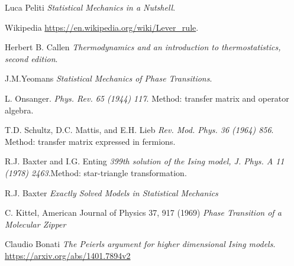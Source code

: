 
\cleardoublepage
{}
\begin{thebibliography}{99}


Luca Peliti
\textit{Statistical Mechanics in a Nutshell}.

Wikipedia 
\url{https://en.wikipedia.org/wiki/Lever_rule}.

Herbert B. Callen
\textit{Thermodynamics and an introduction to thermostatistics, second edition}.

J.M.Yeomans
\textit{Statistical Mechanics of Phase Transitions}.

L. Onsanger.
\textit{Phys. Rev. 65 (1944) 117}. Method: transfer matrix and operator algebra.

T.D. Schultz, D.C. Mattis, and E.H. Lieb
\textit{Rev. Mod. Phys. 36 (1964) 856}. Method: transfer matrix expressed in fermions.


R.J. Baxter and I.G. Enting
\textit{399th solution of the Ising model, J. Phys. A 11 (1978) 2463}.Method: star-triangle transformation. 

R.J. Baxter
\textit{Exactly Solved Models in Statistical Mechanics}

C. Kittel, American Journal of Physics 37, 917 (1969)
\textit{Phase Transition of a Molecular Zipper}

Claudio Bonati
\textit{The Peierls argument for higher dimensional Ising models}. 
\url{https://arxiv.org/abs/1401.7894v2}

 

%

\end{thebibliography}